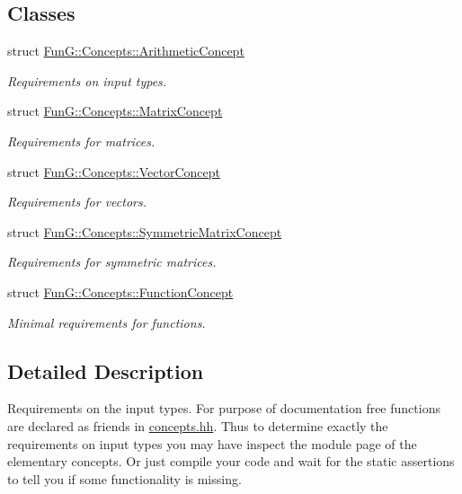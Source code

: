 \subsection*{Classes}
\begin{DoxyCompactItemize}
\item 
struct \hyperlink{structFunG_1_1Concepts_1_1ArithmeticConcept}{Fun\-G\-::\-Concepts\-::\-Arithmetic\-Concept}
\begin{DoxyCompactList}\small\item\em Requirements on input types. \end{DoxyCompactList}\item 
struct \hyperlink{structFunG_1_1Concepts_1_1MatrixConcept}{Fun\-G\-::\-Concepts\-::\-Matrix\-Concept}
\begin{DoxyCompactList}\small\item\em Requirements for matrices. \end{DoxyCompactList}\item 
struct \hyperlink{structFunG_1_1Concepts_1_1VectorConcept}{Fun\-G\-::\-Concepts\-::\-Vector\-Concept}
\begin{DoxyCompactList}\small\item\em Requirements for vectors. \end{DoxyCompactList}\item 
struct \hyperlink{structFunG_1_1Concepts_1_1SymmetricMatrixConcept}{Fun\-G\-::\-Concepts\-::\-Symmetric\-Matrix\-Concept}
\begin{DoxyCompactList}\small\item\em Requirements for symmetric matrices. \end{DoxyCompactList}\item 
struct \hyperlink{structFunG_1_1Concepts_1_1FunctionConcept}{Fun\-G\-::\-Concepts\-::\-Function\-Concept}
\begin{DoxyCompactList}\small\item\em Minimal requirements for functions. \end{DoxyCompactList}\end{DoxyCompactItemize}


\subsection{Detailed Description}
Requirements on the input types. For purpose of documentation free functions are declared as friends in \hyperlink{concepts_8hh}{concepts.\-hh}. Thus to determine exactly the requirements on input types you may have inspect the module page of the elementary concepts. Or just compile your code and wait for the static assertions to tell you if some functionality is missing. 